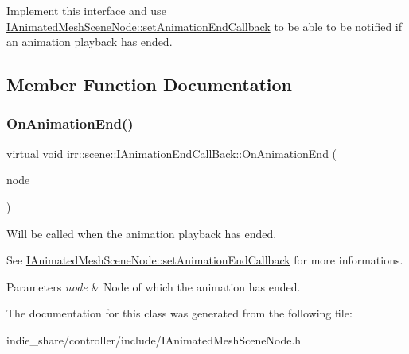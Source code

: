 Implement this interface and use \hyperlink{classirr_1_1scene_1_1IAnimatedMeshSceneNode_ad688bb5a7654116d1ee823e48393f1bd}{I\+Animated\+Mesh\+Scene\+Node\+::set\+Animation\+End\+Callback} to be able to be notified if an animation playback has ended. 

\subsection{Member Function Documentation}
\mbox{\label{classirr_1_1scene_1_1IAnimationEndCallBack_a7676b37828697b63e42ad5264274cc1f}} 
\subsubsection{\texorpdfstring{On\+Animation\+End()}{OnAnimationEnd()}}
{\footnotesize\ttfamily virtual void irr\+::scene\+::\+I\+Animation\+End\+Call\+Back\+::\+On\+Animation\+End (\begin{DoxyParamCaption}\item[{\hyperlink{classirr_1_1scene_1_1IAnimatedMeshSceneNode}{I\+Animated\+Mesh\+Scene\+Node} $\ast$}]{node }\end{DoxyParamCaption})\hspace{0.3cm}{\ttfamily [pure virtual]}}



Will be called when the animation playback has ended. 

See \hyperlink{classirr_1_1scene_1_1IAnimatedMeshSceneNode_ad688bb5a7654116d1ee823e48393f1bd}{I\+Animated\+Mesh\+Scene\+Node\+::set\+Animation\+End\+Callback} for more informations. 
\begin{DoxyParams}{Parameters}
{\em node} & Node of which the animation has ended. \\
\hline
\end{DoxyParams}


The documentation for this class was generated from the following file\+:\begin{DoxyCompactItemize}
\item 
indie\+\_\+share/controller/include/I\+Animated\+Mesh\+Scene\+Node.\+h\end{DoxyCompactItemize}
